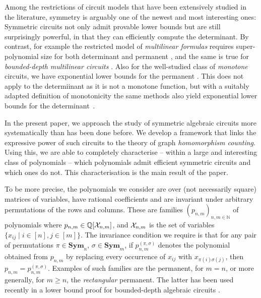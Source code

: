 \documentclass[10pt,a4paper]{article}
\theoremstyle{definition}
\theoremstyle{plain}
\theoremstyle{remark}
\newcommand{\Xx}{{\cal X}}
\newcommand{\Sym}{\mathbf{Sym}}
\newcommand{\bbN}{\mathbb{N}}
\newcommand{\bbQ}{\mathbb{Q}}
\begin{document}
Among the restrictions of circuit models that have been extensively studied in the literature, symmetry is arguably one of the newest and most interesting ones: Symmetric circuits not only admit provable lower bounds but are still surprisingly powerful, in that they can efficiently compute the determinant. 
By contrast, for example the restricted model of \emph{multilinear
  formulas} requires super-polynomial size for both determinant and
permanent \cite{Raz04}, and the same is true for \emph{bounded-depth
  multilinear circuits} \cite{RazY08}. Also for the well-studied class
of \emph{monotone} circuits, we have exponential lower bounds for the
permanent \cite{JerrumS82}.  This does not apply to the determiinant
as it is not a monotone function, but with a suitably adapted
definition of monotonicity the same methods also yield exponential
lower bounds for the determinant~\cite{KayalS14}.

In the present paper, we approach the study of symmetric algebraic circuits more systematically than has been done before. We develop a framework that links the expressive power of such circuits to the theory of graph \emph{homomorphism counting}. Using this, we are able to completely characterise -- within a large and interesting class of polynomials -- which polynomials admit efficient symmetric circuits and which ones do not. This characterisation is the main result of the paper.

To be more precise, the polynomials we consider are over (not necessarily square) matrices of variables, have rational coefficients and are invariant under arbitrary permutations of the rows and columns.  These are families $(p_{n,m})_{n,m \in \bbN}$ of polynomials where $p_{n,m} \in \bbQ[\Xx_{n,m}]$, and $\Xx_{n,m}$ is the set of variables $\{x_{ij} \mid i \in [n], j \in [m]\}$.  The invariance condition we require is that for any pair of permutations $\pi \in \Sym_n$, $\sigma \in \Sym_m$, if $p_{n,m}^{(\pi,\sigma)}$ denotes the polynomial obtained from $p_{n,m}$ by replacing every occurrence of $x_{ij}$ with $x_{\pi(i)\sigma(j)}$, then $p_{n,m} = p_{n,m}^{(\pi,\sigma)}$. 
Examples of such families are the permanent, for $m = n$, or more generally, for $m \geq n$, the \emph{rectangular} permanent. The latter has been used recently in a lower bound proof for bounded-depth algebraic circuits \cite{forbes2024low}.
\end{document}
